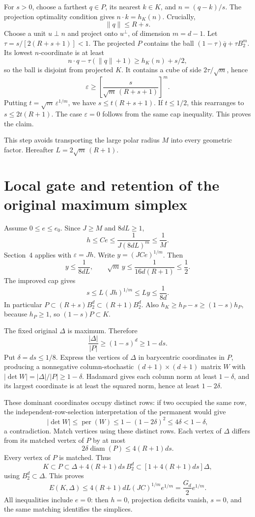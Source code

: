 \documentclass[11pt,letterpaper]{article}
\newcommand{\BB}{B_2^d}
\newcommand{\diam}{\operatorname{diam}}
\newcommand{\per}{\operatorname{per}}
\begin{document}
For $s>0$, choose a farthest $q\in P$, its nearest $k\in K$, and
$n=(q-k)/s$. The projection optimality condition gives $n\cdot k=h_K(n)$.
Crucially,
\[
 \|q\|\le R+s.
\]
Choose a unit $u\perp n$ and project onto $u^\perp$, of dimension $m=d-1$.
Let $\tau=s/[2(R+s+1)]<1$. The projected $P$ contains the ball
$(1-\tau)\overline q+\tau B_2^m$. Its lowest $n$-coordinate is at least
\[
 n\cdot q-\tau(\|q\|+1)\ge h_K(n)+s/2,
\]
so the ball is disjoint from projected $K$. It contains a cube of side
$2\tau/\sqrt m$, hence
\[
 \varepsilon\ge\left[\frac{s}{\sqrt m\,(R+s+1)}\right]^m.
\]
Putting $t=\sqrt m\,\varepsilon^{1/m}$, we have $s\le t(R+s+1)$.
If $t\le1/2$, this rearranges to $s\le2t(R+1)$. The case $\varepsilon=0$
follows from the same cap inequality. This proves the claim.

This step avoids transporting the large polar radius $M$ into every
geometric factor. Hereafter $L=2\sqrt m\,(R+1)$.

\section{Local gate and retention of the original maximum simplex}
Assume $0\le e\le e_0$. Since $J\ge M$ and $8dL\ge1$,
\[
 h\le Ce\le\frac1{J(8dL)^m}\le\frac1M.
\]
Section~4 applies with $\varepsilon=Jh$. Write $y=(JCe)^{1/m}$. Then
\[
 y\le\frac1{8dL},\qquad
 \sqrt m\,y\le\frac1{16d(R+1)}\le\frac12.
\]
The improved cap gives
\[
 s\le L(Jh)^{1/m}\le Ly\le\frac1{8d}.
\]
In particular $P\subset(R+s)\BB\subset(R+1)\BB$. Also
$h_K\ge h_P-s\ge(1-s)h_P$, because $h_P\ge1$, so $(1-s)P\subset K$.

The fixed original $\Delta$ is maximum. Therefore
\[
 \frac{|\Delta|}{|P|}\ge(1-s)^d\ge1-ds.
\]
Put $\delta=ds\le1/8$. Express the vertices of $\Delta$ in barycentric
coordinates in $P$, producing a nonnegative column-stochastic
$(d+1)\times(d+1)$ matrix $W$ with
$|\det W|=|\Delta|/|P|\ge1-\delta$. Hadamard gives each column norm at
least $1-\delta$, and its largest coordinate is at least the squared norm,
hence at least $1-2\delta$.

These dominant coordinates occupy distinct rows: if two occupied the same
row, the independent-row-selection interpretation of the permanent would
give
\[
 |\det W|\le\per(W)\le1-(1-2\delta)^2\le4\delta<1-\delta,
\]
a contradiction. Match vertices using these distinct rows. Each vertex
of $\Delta$ differs from its matched vertex of $P$ by at most
\[
 2\delta\diam(P)\le4(R+1)ds.
\]
Every vertex of $P$ is matched. Thus
\[
 K\subset P\subset\Delta+4(R+1)ds\,\BB
       \subset[1+4(R+1)ds]\Delta,
\]
using $\BB\subset\Delta$. This proves
\[
 E(K,\Delta)\le4(R+1)dL(JC)^{1/m}e^{1/m}
                =\frac{G_d}{2}e^{1/m}.
\]
All inequalities include $e=0$: then $h=0$, projection deficits vanish,
$s=0$, and the same matching identifies the simplices.
\end{document}
